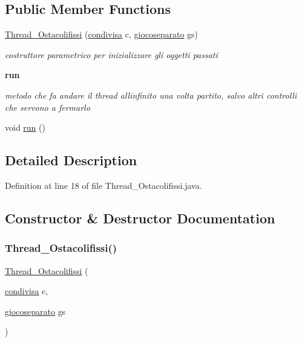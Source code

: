\subsection*{Public Member Functions}
\begin{DoxyCompactItemize}
\item 
\hyperlink{classcargame_1_1_thread___ostacolifissi_aeaf0fc8556dbe84f54140002dc279907}{Thread\+\_\+\+Ostacolifissi} (\hyperlink{classcargame_1_1condivisa}{condivisa} c, \hyperlink{classcargame_1_1giocoseparato}{giocoseparato} gs)
\begin{DoxyCompactList}\small\item\em costruttore parametrico per inizializzare gli oggetti passati \end{DoxyCompactList}\end{DoxyCompactItemize}
\begin{Indent}\textbf{ run}\par
{\em metodo che fa andare il thread all\textquotesingle{}infinito una volta partito, salvo altri controlli che servono a fermarlo }\begin{DoxyCompactItemize}
\item 
void \hyperlink{classcargame_1_1_thread___ostacolifissi_a13a43e6d814de94978c515cb084873b1}{run} ()
\end{DoxyCompactItemize}
\end{Indent}


\subsection{Detailed Description}


Definition at line 18 of file Thread\+\_\+\+Ostacolifissi.\+java.



\subsection{Constructor \& Destructor Documentation}
\mbox{\label{classcargame_1_1_thread___ostacolifissi_aeaf0fc8556dbe84f54140002dc279907}} 
\subsubsection{\texorpdfstring{Thread\+\_\+\+Ostacolifissi()}{Thread\_Ostacolifissi()}}
{\footnotesize\ttfamily \hyperlink{classcargame_1_1_thread___ostacolifissi}{Thread\+\_\+\+Ostacolifissi} (\begin{DoxyParamCaption}\item[{\hyperlink{classcargame_1_1condivisa}{condivisa}}]{c,  }\item[{\hyperlink{classcargame_1_1giocoseparato}{giocoseparato}}]{gs }\end{DoxyParamCaption})}



